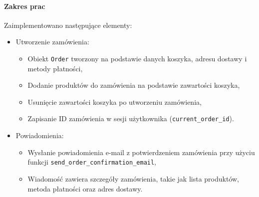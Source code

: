 \documentclass[12pt,a4paper,oneside]{article}
\theoremstyle{definition}
\numberwithin{equation}{section}
\begin{document}
\paragraph{Zakres prac}
Zaimplementowano następujące elementy:
\begin{itemize}
    \item Utworzenie zamówienia:
    \begin{itemize}
        \item Obiekt \texttt{Order} tworzony na podstawie danych koszyka, adresu dostawy i metody płatności,
        \item Dodanie produktów do zamówienia na podstawie zawartości koszyka,
        \item Usunięcie zawartości koszyka po utworzeniu zamówienia,
        \item Zapisanie ID zamówienia w sesji użytkownika (\texttt{current\_order\_id}).
    \end{itemize}
    \item Powiadomienia:
    \begin{itemize}
        \item Wysłanie powiadomienia e-mail z potwierdzeniem zamówienia przy użyciu funkcji \texttt{send\_order\_confirmation\_email},
        \item Wiadomość zawiera szczegóły zamówienia, takie jak lista produktów, metoda płatności oraz adres dostawy.
    \end{itemize}
\end{itemize}
%
%
\end{document}
